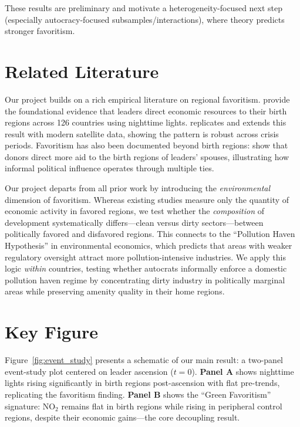 \documentclass[12pt]{article}
\begin{document}
These results are preliminary and motivate a heterogeneity-focused next step (especially autocracy-focused subsamples/interactions), where theory predicts stronger favoritism.

\section*{Related Literature}

Our project builds on a rich empirical literature on regional favoritism. \textcite{HodlerRaschky2014} provide the foundational evidence that leaders direct economic resources to their birth regions across 126 countries using nighttime lights. \textcite{Bora2025} replicates and extends this result with modern satellite data, showing the pattern is robust across crisis periods. Favoritism has also been documented beyond birth regions: \textcite{Bomprezzi2024Spouses} show that donors direct more aid to the birth regions of leaders' spouses, illustrating how informal political influence operates through multiple ties.

Our project departs from all prior work by introducing the \textit{environmental} dimension of favoritism. Whereas existing studies measure only the quantity of economic activity in favored regions, we test whether the \textit{composition} of development systematically differs---clean versus dirty sectors---between politically favored and disfavored regions. This connects to the ``Pollution Haven Hypothesis'' \parencite{CopelandTaylor2004} in environmental economics, which predicts that areas with weaker regulatory oversight attract more pollution-intensive industries. We apply this logic \textit{within} countries, testing whether autocrats informally enforce a domestic pollution haven regime by concentrating dirty industry in politically marginal areas while preserving amenity quality in their home regions.

\section*{Key Figure}

Figure~\ref{fig:event_study} presents a schematic of our main result: a two-panel event-study plot centered on leader ascension ($t = 0$). \textbf{Panel A} shows nighttime lights rising significantly in birth regions post-ascension with flat pre-trends, replicating the favoritism finding. \textbf{Panel B} shows the ``Green Favoritism'' signature: NO$_2$ remains flat in birth regions while rising in peripheral control regions, despite their economic gains---the core decoupling result.
\end{document}
